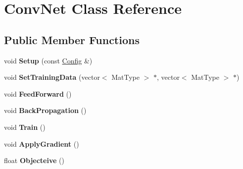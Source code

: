 \hypertarget{class_conv_net}{\section{Conv\+Net Class Reference}
\label{class_conv_net}
}
\subsection*{Public Member Functions}
\begin{DoxyCompactItemize}
\item 
\hypertarget{class_conv_net_a1494deafc867bf0a25ff4adb748cb9d5}{void {\bfseries Setup} (const \hyperlink{struct_config}{Config} \&)}\label{class_conv_net_a1494deafc867bf0a25ff4adb748cb9d5}

\item 
\hypertarget{class_conv_net_ac5a073e999f383bacdfb465bc1cdfd15}{void {\bfseries Set\+Training\+Data} (vector$<$ Mat\+Type $>$ $\ast$, vector$<$ Mat\+Type $>$ $\ast$)}\label{class_conv_net_ac5a073e999f383bacdfb465bc1cdfd15}

\item 
\hypertarget{class_conv_net_a38131e53f29ba33f57b9e69640593bed}{void {\bfseries Feed\+Forward} ()}\label{class_conv_net_a38131e53f29ba33f57b9e69640593bed}

\item 
\hypertarget{class_conv_net_aa0508fd5e41578696b8762f302508923}{void {\bfseries Back\+Propagation} ()}\label{class_conv_net_aa0508fd5e41578696b8762f302508923}

\item 
\hypertarget{class_conv_net_abf4d97bb7264d7cc8e8beeb550468710}{void {\bfseries Train} ()}\label{class_conv_net_abf4d97bb7264d7cc8e8beeb550468710}

\item 
\hypertarget{class_conv_net_ad71767dc3d463f60346ac71ff2c1c4ff}{void {\bfseries Apply\+Gradient} ()}\label{class_conv_net_ad71767dc3d463f60346ac71ff2c1c4ff}

\item 
\hypertarget{class_conv_net_a9b9e2e5e1c4d84be553b2729efb44b10}{float {\bfseries Objecteive} ()}\label{class_conv_net_a9b9e2e5e1c4d84be553b2729efb44b10}

\end{DoxyCompactItemize}
